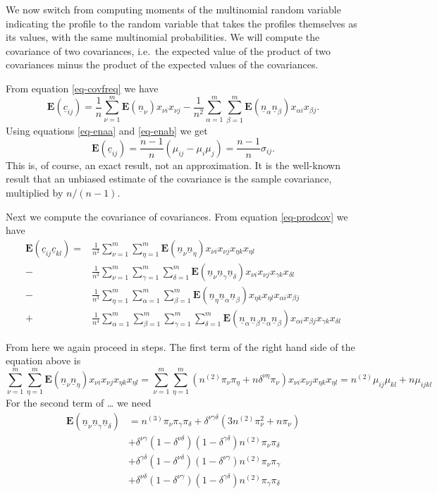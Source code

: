 \documentclass[
  12pt,
  letterpaper,
  DIV=11,
  numbers=noendperiod]{scrartcl}
\newcommand{\ul}[1]{\underline{#1}}
\begin{document}
We now switch from computing moments of the multinomial random variable
indicating the profile to the random variable that takes the profiles
themselves as its values, with the same multinomial probabilities. We
will compute the covariance of two covariances, i.e.~the expected value
of the product of two covariances minus the product of the expected
values of the covariances.

From equation \eqref{eq-covfreq} we have \begin{equation}
\mathbf{E}(\ul{c}_{ij})=\frac{1}{n}\sum_{\nu=1}^m\mathbf{E}(\ul{n}_\nu) x_{\nu i}x_{\nu j}-\frac{1}{n^2}\sum_{\alpha=1}^m\sum_{\beta=1}^m\mathbf{E}(\ul{n}_\alpha\ul{n}_\beta) x_{\alpha i}x_{\beta j}.\label{eq-ecov}
\end{equation} Using equations \eqref{eq-enaa} and \eqref{eq-enab} we
get \begin{equation}
\mathbf{E}(\ul{c}_{ij})=\frac{n-1}{n}(\mu_{ij}-\mu_i\mu_j)=\frac{n-1}{n}\sigma_{ij}.
\label{eq-ecov2}
\end{equation} This is, of course, an exact result, not an
approximation. It is the well-known result that an unbiased estimate of
the covariance is the sample covariance, multiplied by \(n/(n-1)\).

Next we compute the covariance of covariances. From equation
\eqref{eq-prodcov} we have \begin{align}
\mathbf{E}(\ul{c}_{ij}\ul{c}_{kl})=&\frac{1}{n^2}\sum_{\nu=1}^m\sum_{\eta=1}^m\mathbf{E}(\ul{n}_\nu \ul{n}_\eta) x_{\nu i}x_{\nu j}x_{\eta k}x_{\eta l}\\
-&\frac{1}{n^3}\sum_{\nu=1}^m\sum_{\gamma=1}^m\sum_{\delta=1}^m\mathbf{E}(\ul{n}_\nu \ul{n}_\gamma\ul{n}_\delta)x_{\nu i}x_{\nu j}x_{\gamma k}x_{\delta l}\\
-&\frac{1}{n^3}\sum_{\eta=1}^m\sum_{\alpha=1}^m\sum_{\beta=1}^m\mathbf{E}(\ul{n}_\eta \ul{n}_\alpha\ul{n}_\beta)x_{\eta k}x_{\eta l}x_{\alpha i}x_{\beta j}\\
+&\frac{1}{n^4}\sum_{\alpha=1}^m\sum_{\beta=1}^m\sum_{\gamma=1}^m\sum_{\delta=1}^m\mathbf{E}(\ul{n}_\alpha\ul{n}_\beta\ul{n}_\alpha\ul{n}_\beta) x_{\alpha i}x_{\beta j} x_{\gamma k}x_{\delta l}
\end{align}

From here we again proceed in steps. The first term of the right hand
side of the equation above is \[
\sum_{\nu=1}^m\sum_{\eta=1}^m\mathbf{E}(\ul{n}_\nu \ul{n}_\eta) x_{\nu i}x_{\nu j}x_{\eta k}x_{\eta l}=\sum_{\nu=1}^m\sum_{\eta=1}^m(n^{(2)}\pi_\nu\pi_\eta+n\delta^{\nu\eta}\pi_\nu)x_{\nu i}x_{\nu j}x_{\eta k}x_{\eta l}=n^{(2)}\mu_{ij}\mu_{kl}+n\mu_{ijkl}
\] For the second term of \ldots{} we need \begin{align}
\mathbf{E}(\ul{n}_\nu\ul{n}_\gamma\ul{n}_\delta)&=
n^{(3)}\pi_\nu\pi_\gamma\pi_\delta+\delta^{\nu\gamma\delta}(3n^{(2)}\pi_\nu^2+n\pi_\nu)\\
&+\delta^{\nu\gamma}(1-\delta^{\nu\delta})(1-\delta^{\gamma\delta})n^{(2)}\pi_\nu\pi_\delta\\&+\delta^{\gamma\delta}(1-\delta^{\nu\delta})(1-\delta^{\nu\gamma})n^{(2)}\pi_\nu\pi_\gamma\\&+\delta^{\nu\delta}(1-\delta^{\nu\gamma})(1-\delta^{\gamma\delta})n^{(2)}\pi_\gamma\pi_\delta
\end{align}
\end{document}
